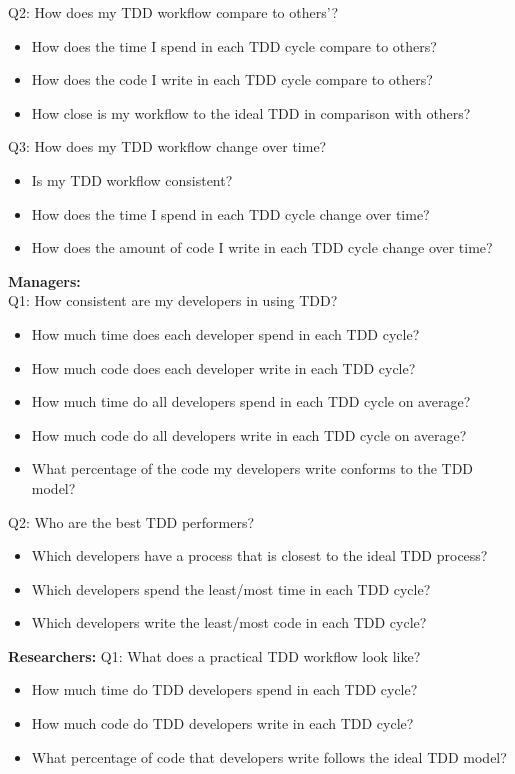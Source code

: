 \documentclass[journal]{vgtc}                %
\begin{document}
Q2: How does my TDD workflow compare to others'?
\begin{itemize}
	\item How does the time I spend in each TDD cycle compare to others?
	\item How does the code I write in each TDD cycle compare to others?
	\item How close is my workflow to the ideal TDD in comparison with others?
\end{itemize}

Q3: How does my TDD workflow change over time?
\begin{itemize}
	\item Is my TDD workflow consistent?
	\item How does the time I spend in each TDD cycle change over time?
	\item How does the amount of code I write in each TDD cycle change over time?
\end{itemize}

\noindent\textbf{Managers:} \\
Q1: How consistent are my developers in using TDD?
\begin{itemize}
	\item How much time does each developer spend in each TDD cycle?
	\item How much code does each developer write in each TDD cycle?
	\item How much time do all developers spend in each TDD cycle on average?
	\item How much code do all developers write in each TDD cycle on average?
	\item What percentage of the code my developers write conforms to the TDD model?
\end{itemize}

Q2: Who are the best TDD performers? 
\begin{itemize}
	\item Which developers have a process that is closest to the ideal TDD process?
	\item Which developers spend the least/most time in each TDD cycle?
	\item Which developers write the least/most code in each TDD cycle?
\end{itemize}
	
\noindent\textbf{Researchers:}
Q1: What does a practical TDD workflow look like?
\begin{itemize}
	\item How much time do TDD developers spend in each TDD cycle?
	\item How much code do TDD developers write in each TDD cycle?
	\item What percentage of code that developers write follows the ideal TDD model?
\end{itemize}
	
\end{document}
